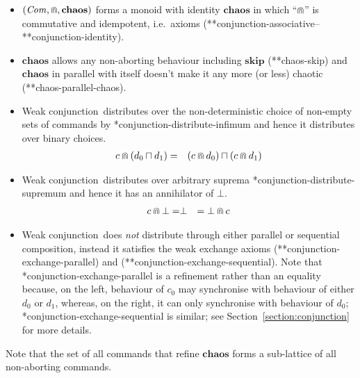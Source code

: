 \documentclass[fleqn]{fac}
\makeatletter
\def\refaxiom{\@ifnextchar*{\@refaxiom}{\@@refaxiom}}
\def\@refaxiom*#1{\ref{axiom-#1}\index{Axiom!#1|LawUse}}
\def\@@refaxiom#1{axiom~(\ref{axiom-#1})\index{Axiom!#1|LawUse}}
\newcommand{\labelproperty}[1]{\label{property-#1}\index{Property!#1|PropertyDef{\ref{property-#1}}}}
\newcommand{\Command}{\mathit{Com}}
\newcommand{\nondet}{\mathbin{\sqcap}}
\newcommand{\Strictconjunction}{Weak conjunction}
\newcommand{\together}{\mathbin{\doublecap}}
\newcommand{\Keyword}[1]{\mathsf{\mathbf{#1}}}
\newcommand{\Abort}{\Keyword{\bot}}
\newcommand{\Chaos}{\Keyword{chaos}}
\newcommand{\Skip}{\Keyword{skip}}
\makeatother
\begin{document}
\begin{itemize}
\item
$(\Command, \together, \Chaos)$ forms a monoid with identity $\Chaos$ in which ``$\together$'' is commutative and idempotent, 
i.e.\ axioms (\refaxiom*{conjunction-associative}--\refaxiom*{conjunction-identity}).
\item
$\Chaos$ allows any non-aborting behaviour including $\Skip$ (\refaxiom*{chaos-skip})
and $\Chaos$ in parallel with itself doesn't make it any more (or less) chaotic (\refaxiom*{chaos-parallel-chaos}).
\item
\Strictconjunction\ distributes over the non-deterministic choice of non-empty sets of commands by \refaxiom{conjunction-distribute-infimum}
and hence it distributes over binary choices.
\begin{eqnarray}
  c \together (d_0 \nondet d_1) & = &  (c \together d_0) \nondet (c \together d_1) \labelproperty{conjunction-distribute-infimum}
\end{eqnarray}
\item
\Strictconjunction\ distributes over arbitrary suprema \refaxiom{conjunction-distribute-supremum}
and hence
it has an annihilator of $\Abort$.
\begin{eqnarray}
  c \together \Abort = & \Abort &  = \Abort \together c  \labelproperty{conjunction-abort-zero}
\end{eqnarray}
\item
\Strictconjunction\ does \emph{not} distribute through either parallel or sequential composition,
instead it satisfies the weak exchange axioms 
(\refaxiom*{conjunction-exchange-parallel}) and (\refaxiom*{conjunction-exchange-sequential}).
Note that \refaxiom{conjunction-exchange-parallel} is a refinement rather than an equality 
because, on the left, behaviour of $c_0$ may synchronise with 
behaviour of either $d_0$ or $d_1$,
whereas, on the right, it can only synchronise with behaviour of $d_0$;
\refaxiom{conjunction-exchange-sequential} is similar;
see Section~\ref{section:conjunction} for more details.
\end{itemize}
Note that the set of all commands that refine $\Chaos$ forms a sub-lattice of all non-aborting commands.
\end{document}
